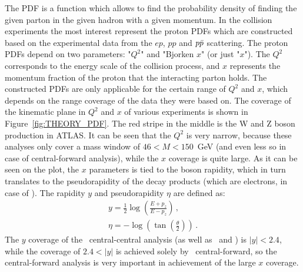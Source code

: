 \begin{figure}
\end{figure}

The PDF is a function which allows to find the probability density of finding the given parton in the given hadron with a given momentum. In the collision experiments the most interest represent the proton PDFs which are constructed based on the experimental data from the $ep$, $pp$ and $p\bar{p}$ scattering. The proton PDFs depend on two parameters: "$Q^{2}$" and "Bjorken $x$" (or just "$x$"). The $Q^{2}$ corresponds to the energy scale of the collision process, and $x$ represents the momentum fraction of the proton that the interacting parton holds. The constructed PDFs are only applicable for the certain range of $Q^{2}$ and $x$, which depends on the range coverage of the data they were based on. The coverage of the kinematic plane in $Q^{2}$ and $x$ of various experiments is shown in Figure~\ref{fig:THEORY_PDF}. The red stripe in the middle is the W and Z boson production in ATLAS. It can be seen that the $Q^{2}$ is very narrow, because these analyses only cover a mass window of $46 < M < 150$~GeV (and even less so in case of central-forward analysis), while the $x$ coverage is quite large. As it can be seen on the plot, the $x$ parameters is tied to the boson rapidity, which in turn translates to the pseudorapidity of the decay products (which are electrons, in case of \Zee). The rapidity $y$ and pseudorapidity $\eta$ are defined as:
\begin{equation}
\begin{gathered}
y = \frac{1}{2} \log \left(\frac{E+p_z}{E-p_z}\right)\,, \\
\eta = - \log (\tan (\frac{\theta}{2}))\,.
\end{gathered}
\end{equation}
The $y$ coverage of the \Zee\ central-central analysis (as well as \Zmm\ and \Wenu) is $|y| < 2.4$, while the coverage of $2.4 < |y|$ is achieved solely by \Zee\ central-forward, so the central-forward analysis is very important in achievement of the large $x$ coverage.

